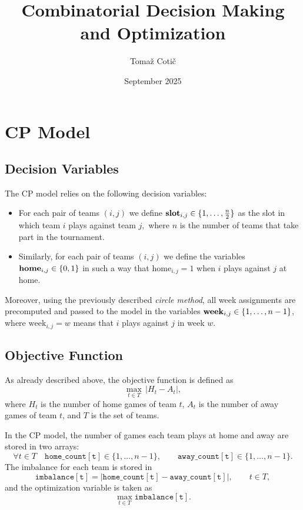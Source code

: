 \documentclass{article}
\title{Combinatorial Decision Making and Optimization}
\author{Tomaž Cotič}
\date{September 2025}
\begin{document}

\section{CP Model}

\subsection{Decision Variables}
The CP model relies on the following decision variables:

\begin{itemize}
    \item For each pair of teams $(i,j)$ we define $\text{\textbf{slot}}_{i,j} \in \{1, \dots, \frac{n}{2}\}$ as the slot in which team $i$ plays against team $j,$ where $n$ is the number of teams that take part in the tournament.
    \item Similarly, for each pair of teams $(i,j)$ we define the variables $\text{\textbf{home}}_{i,j}\in \{0, 1\}$ in such a way that $\text{home}_{i,j}=1$ when $i$ plays against $j$ at home.
\end{itemize}

Moreover, using the previously described \emph{circle method}, all week assignments are precomputed and passed to the model in the variables $\text{\textbf{week}}_{i,j} \in \{1, \dots, n-1\}$, where $\text{week}_{i,j} = w$ means that $i$ plays against $j$ in week $w$.

\subsection{Objective Function}
As already described above, the objective function is defined as
\[
\max_{t \in T} \, |H_t - A_t|,
\]
where \(H_t\) is the number of home games of team \(t\), \(A_t\) is the number of away games of team \(t\), and \(T\) is the set of teams.

In the CP model, the number of games each team plays at home and away are stored in two arrays:
\[
\forall t \in T \quad \mathtt{home\_count[t]} \in \{1, \dots, n-1\}, 
\qquad
\mathtt{away\_count[t]} \in \{1, \dots, n-1\}.
\]
The imbalance for each team is stored in
\[
\mathtt{imbalance[t]} = \lvert \mathtt{home\_count[t]} - \mathtt{away\_count[t]} \rvert,
\qquad t \in T,
\]
and the optimization variable is taken as
\[
\max_{t \in T} \mathtt{imbalance[t]}.
\]
\end{document}
